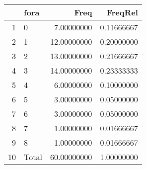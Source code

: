\begin{table}[ht]
\centering
\begin{tabular}{rlrr}
  \hline
 & fora & Freq & FreqRel \\ 
  \hline
1 & 0 & 7.00000000 & 0.11666667 \\ 
  2 & 1 & 12.00000000 & 0.20000000 \\ 
  3 & 2 & 13.00000000 & 0.21666667 \\ 
  4 & 3 & 14.00000000 & 0.23333333 \\ 
  5 & 4 & 6.00000000 & 0.10000000 \\ 
  6 & 5 & 3.00000000 & 0.05000000 \\ 
  7 & 6 & 3.00000000 & 0.05000000 \\ 
  8 & 7 & 1.00000000 & 0.01666667 \\ 
  9 & 8 & 1.00000000 & 0.01666667 \\ 
  10 & Total & 60.00000000 & 1.00000000 \\ 
   \hline
\end{tabular}
\end{table}
